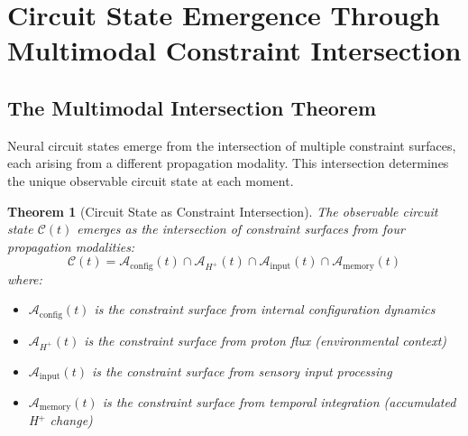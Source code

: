 \documentclass[aps,prd,twocolumn,superscriptaddress,floatfix,nofootinbib]{revtex4-2}
\newtheorem{theorem}{Theorem}[section]
\theoremstyle{remark}
\begin{document}
\section{Circuit State Emergence Through Multimodal Constraint Intersection}
\label{sec:consciousness}

\subsection{The Multimodal Intersection Theorem}

Neural circuit states emerge from the intersection of multiple constraint surfaces, each arising from a different propagation modality. This intersection determines the unique observable circuit state at each moment.

\begin{theorem}[Circuit State as Constraint Intersection]
\label{thm:consciousness}
The observable circuit state $\mathcal{C}(t)$ emerges as the intersection of constraint surfaces from four propagation modalities:
\begin{equation}
\boxed{\mathcal{C}(t) = \mathcal{A}_{\text{config}}(t) \cap \mathcal{A}_{H^+}(t) \cap \mathcal{A}_{\text{input}}(t) \cap \mathcal{A}_{\text{memory}}(t)}
\end{equation}
where:
\begin{itemize}
\item $\mathcal{A}_{\text{config}}(t)$ is the constraint surface from internal configuration dynamics
\item $\mathcal{A}_{H^+}(t)$ is the constraint surface from proton flux (environmental context)
\item $\mathcal{A}_{\text{input}}(t)$ is the constraint surface from sensory input processing
\item $\mathcal{A}_{\text{memory}}(t)$ is the constraint surface from temporal integration (accumulated H$^+$ change)
\end{itemize}
\end{theorem}
\end{document}
